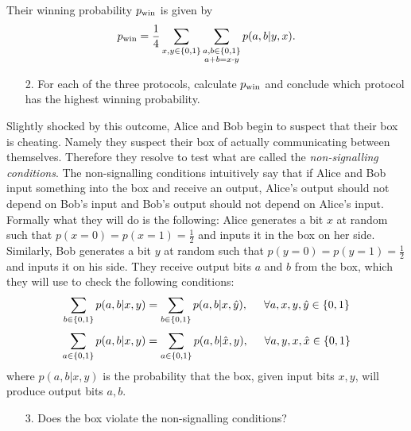 \begin{exercises}
\begin{itemize}
\end{itemize}
Their winning probability \(p_{\rm win}\) is given by
\[p_{\rm win} = \frac{1}{4}\sum_{x, y \in \{0,1\}}\sum_{\substack{a, b \in \{0,1\} \\ a+ b = x\cdot y}}p(a,b|y,x).\]
\begin{enumerate}
\item[2.] For each of the three protocols, calculate $p_{\rm win}$ and conclude which protocol has the highest winning probability.
\end{enumerate}
Slightly shocked by this outcome, Alice and Bob begin to suspect that their box is cheating. Namely they suspect their box of actually communicating between themselves. Therefore they resolve to test what are called the \emph{non-signalling conditions}. The non-signalling conditions intuitively say that if Alice and Bob input something into the box and receive an output, Alice's output should not depend on Bob's input and Bob's output should not depend on Alice's input. Formally what they will do is the following: Alice generates a bit \(x\) at random such that \(p(x=0) =p(x=1) = \frac{1}{2}\) and inputs it in the box on her side. Similarly, Bob generates a bit \(y\) at random such that \(p(y=0) =p(y=1) = \frac{1}{2}\) and inputs it on his side. They receive output bits \(a\) and \(b\) from the box, which they will use to check the following conditions:
\[\sum_{b\in \{0,1\}} p(a,b|x, y) = \sum_{b\in \{0,1\}} p(a,b|x, \hat{y}), \hspace{5mm} \forall a,x, y, \hat{y}\in\{0,1\}\]
\[\sum_{a\in \{0,1\}} p(a,b|x, y) = \sum_{a\in \{0,1\}} p(a,b|\hat{x},y), \hspace{5mm} \forall a, y, x,\hat{x}\in\{0,1\}\]
where \(p(a,b|x,y)\) is the probability that the box, given input bits \(x,y\), will produce output bits \(a,b\).
\begin{enumerate}
\item[3.] Does the box violate the non-signalling conditions?

\end{enumerate}
\end{exercises}
